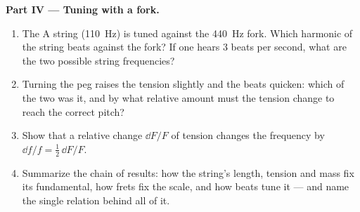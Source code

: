 \begin{problem}
\medskip
\noindent\textbf{Part IV --- Tuning with a fork.}
\begin{enumerate}[resume]
  \item The A string (\qty{110}{Hz}) is tuned against the \qty{440}{Hz}
        fork. Which harmonic of the string beats against the fork? If
        one hears \qty{3}{} beats per second, what are the two possible
        string frequencies?
  \item Turning the peg raises the tension slightly and the beats
        quicken: which of the two was it, and by what relative amount
        must the tension change to reach the correct pitch?
  \item Show that a relative change $\dd F/F$ of tension changes the
        frequency by $\dd f/f = \tfrac12\,\dd F/F$.
  \item Summarize the chain of results: how the string's length, tension
        and mass fix its fundamental, how frets fix the scale, and how
        beats tune it --- and name the single relation behind all of it.
\end{enumerate}
\end{problem}
